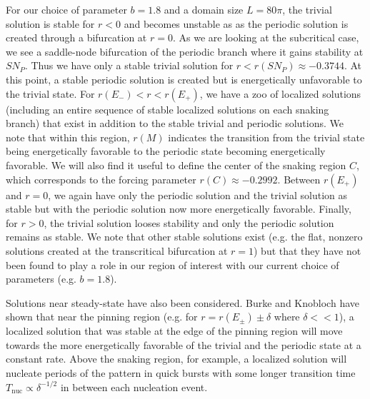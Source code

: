 \documentclass[../main/TimeForcingSHE.tex]{subfiles}
\begin{document}
For our choice of parameter $b=1.8$ and a domain size $L=80\pi$, the trivial solution is stable for $r<0$ and becomes unstable as as the periodic solution is created through a bifurcation at $r=0$.  As we are looking at the subcritical case, we see a saddle-node bifurcation of the periodic branch where it gains stability at $SN_P$.  Thus we have only a stable trivial solution for $r<r(SN_P)\approx -0.3744$. At this point, a stable periodic solution is created but is energetically unfavorable to the trivial state.  For $r(E_-)<r<r(E_+)$, we have a zoo of localized solutions (including an entire sequence of stable localized solutions on each snaking branch) that exist in addition to the stable trivial and periodic solutions.  We note that within this region, $r(M)$ indicates the transition from the trivial state being energetically favorable to the periodic state becoming energetically favorable.  We will also find it useful to define the center of the snaking region $C$, which corresponds to  the forcing parameter $r(C)\approx -0.2992$.  Between $r(E_+)$ and $r=0$, we again have only the periodic solution and the trivial solution as stable  but with the periodic solution now more energetically favorable.   Finally, for $r>0$, the trivial solution looses stability and only the periodic solution remains as stable.  We note that other stable solutions exist (e.g. the flat, nonzero solutions created at the transcritical bifurcation at $r=1$) but that they have not been found to play a role in our region of interest with our current choice of parameters (e.g. $b=1.8$). 

Solutions near steady-state have also been considered.  Burke and Knobloch \cite{burke2006} have shown that near the pinning region (e.g. for $r=r(E_{\pm})\pm\delta$ where $\delta <<1$), a localized solution that was stable at the edge of the pinning region will move towards the more energetically favorable of the trivial and the periodic state at a constant rate.  Above the snaking region, for example, a localized solution will nucleate periods of the pattern in quick bursts with some longer transition time $T_{\text{nuc}}\propto \delta^{-1/2}$ in between each nucleation event.  
\end{document}

